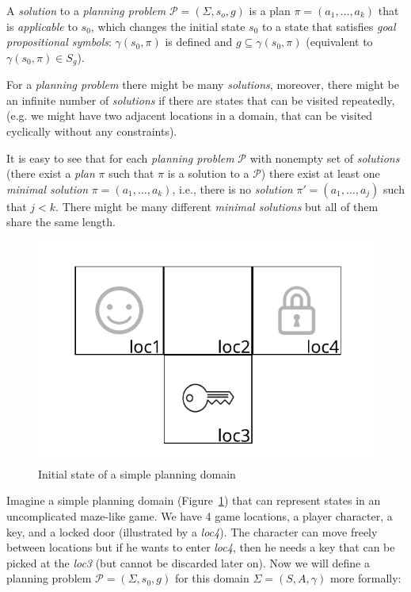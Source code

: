 \begin{defn}\label{def01:4}
    A \emph{solution} to a \emph{planning problem} $\mathcal{P}=(\Sigma,s_o,g)$ is a plan $\pi=(a_1,\dots,a_k)$ that is \emph{applicable} to $s_0$, which changes the initial state $s_0$ to a state that satisfies \emph{goal propositional symbols}: $\gamma(s_0,\pi)$ is defined and $g \subseteq \gamma(s_0,\pi)$ (equivalent to $\gamma(s_0,\pi) \in S_g$).
\end{defn}

\noindent
For a \emph{planning problem} there might be many \emph{solutions}, moreover, there might be an infinite number of \emph{solutions} if there are states that can be visited repeatedly, (e.g. we might have two adjacent locations in a domain, that can be visited cyclically without any constraints).

\medbreak\noindent
It is easy to see that for each \emph{planning problem} $\mathcal{P}$ with nonempty set of \emph{solutions} (there exist a \emph{plan} $\pi$ such that $\pi$ is a solution to a $\mathcal{P}$) there exist at least one \emph{minimal solution} $\pi=(a_1,\dots,a_k)$, i.e., there is no \emph{solution} $\pi'=(a_1,\dots,a_j)$ such that $j < k$. There might be many different \emph{minimal solutions} but all of them share the same length.


\begin{example}\label{ex01:1}
    \begin{figure}
        \centering
        \includegraphics{img/key1.pdf}
        \caption{Initial state of a simple planning domain}
        \label{fig01:1}
    \end{figure}
    
    Imagine a simple planning domain (Figure~\ref{fig01:1}) that can represent states in an uncomplicated maze-like game. We have 4 game locations, a player character, a key, and a locked door (illustrated by a \emph{loc4}). The character can move freely between locations but if he wants to enter \emph{loc4}, then he needs a key that can be picked at the \emph{loc3} (but cannot be discarded later on). Now we will define a planning problem $\mathcal{P}=(\Sigma,s_0,g)$ for this domain $\Sigma=(S,A,\gamma)$ more formally:
    
\end{example}

